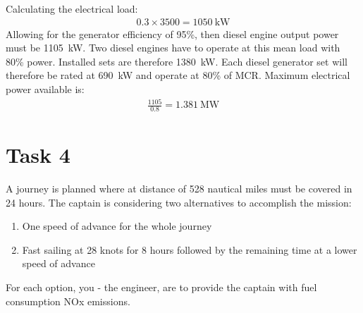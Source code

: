 Calculating the electrical load:
\begin{gather}
    0.3\times 3500 = \SI{1050}{\kilo\watt}
\end{gather}
Allowing for the generator efficiency of 95\%, then diesel engine output power must be \SI{1105}{\kilo\watt}. Two diesel engines have to operate at this mean load with 80\% power. Installed sets are therefore \SI{1380}{\kilo\watt}. Each diesel generator set will therefore be rated at \SI{690}{\kilo\watt} and operate at 80\% of MCR. Maximum electrical power available is:
\begin{gather}
    \frac{1105}{0.8} = \SI{1.381}{\mega\watt}
\end{gather}
\section{Task 4}
A journey is planned where at distance of 528 nautical miles must be covered in 24 hours. The captain is considering two alternatives to accomplish the mission:
\begin{enumerate}
    \item One speed of advance for the whole journey
    \item Fast sailing at 28 knots for 8 hours followed by the remaining time at a lower speed of advance
\end{enumerate}
For each option, you - the engineer, are to provide the captain with fuel consumption NOx emissions.
